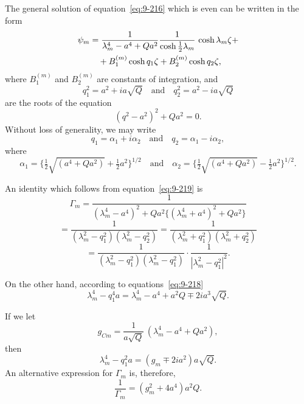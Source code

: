 The general solution of equation~\eqref{eq:9-216} which is even can be written in the form
\begin{align}
\psi_m &= \frac{1}{\lambda_m^4 - a^4 + Qa^2}\frac{1}{\cosh \frac{1}{2}\lambda_m}\,\cosh\lambda_m\zeta + \notag \\
&\quad + B_1^{(m)}\cosh q_1\zeta + B_2^{(m)}\cosh q_2\zeta, \label{eq:9-217}
\end{align}
where $B_1^{(m)}$ and $B_2^{(m)}$ are constants of integration, and
\begin{equation}
q_1^2 = a^2 + ia\sqrt{Q} \quad \text{and} \quad q_2^2 = a^2 - ia\sqrt{Q} \label{eq:9-218}
\end{equation}
are the roots of the equation
\begin{equation}
(q^2 - a^2)^2 + Qa^2 = 0. \label{eq:9-219}
\end{equation}
Without loss of generality, we may write
\begin{equation}
q_1 = \alpha_1 + i\alpha_2 \quad \text{and} \quad q_2 = \alpha_1 - i\alpha_2, \label{eq:9-220}
\end{equation}
where
\begin{equation}
\alpha_1 = \{\tfrac{1}{2}\sqrt{(a^4 + Qa^2)} + \tfrac{1}{2}a^2\}^{1/2} \quad \text{and} \quad \alpha_2 = \{\tfrac{1}{2}\sqrt{(a^4 + Qa^2)} - \tfrac{1}{2}a^2\}^{1/2}. \label{eq:9-221}
\end{equation}

An identity which follows from equation~\eqref{eq:9-219} is
\begin{equation}
\Gamma_m = \frac{1}{(\lambda_m^4 - a^4)^2 + Qa^2\{(\lambda_m^4 + a^4)^2 + Qa^2\}} \label{eq:9-222}
\end{equation}
\[
= \frac{1}{(\lambda_m^2 - q_1^2)(\lambda_m^2 - q_2^2)} = \frac{1}{(\lambda_m^2 + q_1^2)(\lambda_m^2 + q_2^2)}
\]
\[
= \frac{1}{(\lambda_m^2 - q_1^2)(\lambda_m^2 - q_1^2)} \cdot \frac{1}{|\lambda_m^2 - q_1^2|^2}.
\]

On the other hand, according to equations~\eqref{eq:9-218}
\begin{equation}
\lambda_m^4 - q_1^4 a = \lambda_m^4 - a^4 + a^2 Q \mp 2ia^3\sqrt{Q}. \label{eq:9-223}
\end{equation}

If we let
\begin{equation}
g_{Cm} = \frac{1}{a\sqrt{Q}}\,(\lambda_m^4 - a^4 + Qa^2), \label{eq:9-224}
\end{equation}
then
\begin{equation}
\lambda_m^4 - q_1^2 a = (g_m \mp 2ia^2)a\sqrt{Q}. \label{eq:9-225}
\end{equation}
An alternative expression for $\Gamma_m$ is, therefore,
\begin{equation}
\frac{1}{\Gamma_m} = (g_m^2 + 4a^4)a^2 Q. \label{eq:9-226}
\end{equation}

